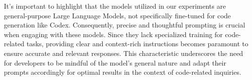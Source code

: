 It's important to highlight that the models utilized in our experiments are general-purpose Large Language Models\cite{}, not specifically fine-tuned for code generation like Codex\cite{finnie-ansley_robots_2022}. Consequently, precise and thoughtful prompting is crucial when engaging with these models. Since they lack specialized training for code-related tasks, providing clear and context-rich instructions becomes paramount to ensure accurate and relevant responses. This characteristic underscores the need for developers to be mindful of the model's general nature and adapt their prompts accordingly for optimal results in the context of code-related inquiries.